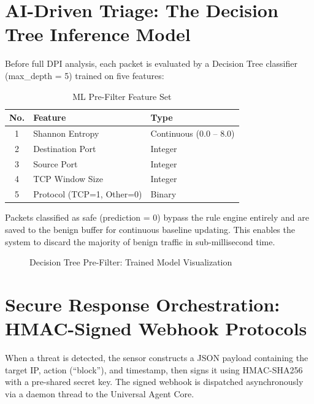 \section{AI-Driven Triage: The Decision Tree Inference Model}

Before full DPI analysis, each packet is evaluated by a Decision Tree classifier (max\_depth = 5) trained on five features:

\begin{table}[h]
\centering
\caption{ML Pre-Filter Feature Set}
\label{tab:ml_features}
\begin{tabular}{|c|l|l|}
\hline
\textbf{No.} & \textbf{Feature} & \textbf{Type} \\
\hline
1 & Shannon Entropy & Continuous (0.0 -- 8.0) \\
\hline
2 & Destination Port & Integer \\
\hline
3 & Source Port & Integer \\
\hline
4 & TCP Window Size & Integer \\
\hline
5 & Protocol (TCP=1, Other=0) & Binary \\
\hline
\end{tabular}
\end{table}

Packets classified as safe (prediction = 0) bypass the rule engine entirely and are saved to the benign buffer for continuous baseline updating. This enables the system to discard the majority of benign traffic in sub-millisecond time.

\begin{figure}[h]
\centering
{}
\caption{Decision Tree Pre-Filter: Trained Model Visualization}
\label{fig:decision_tree_viz}
\end{figure}

\section{Secure Response Orchestration: HMAC-Signed Webhook Protocols}

When a threat is detected, the sensor constructs a JSON payload containing the target IP, action (``block''), and timestamp, then signs it using HMAC-SHA256 with a pre-shared secret key. The signed webhook is dispatched asynchronously via a daemon thread to the Universal Agent Core.

